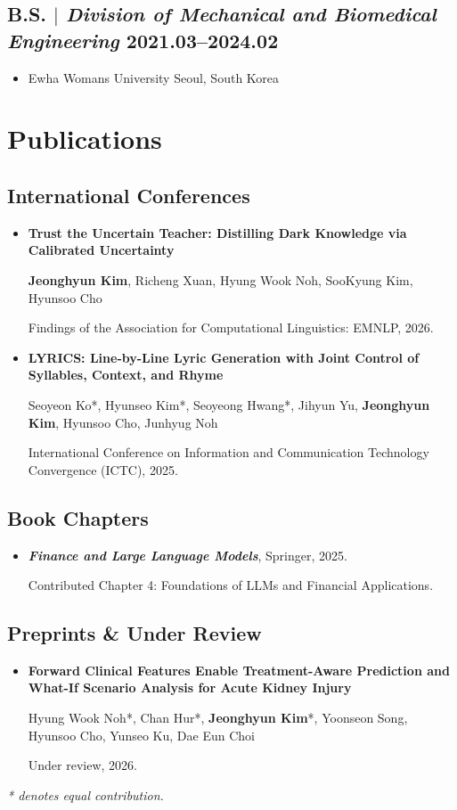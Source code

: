 \documentclass[10pt,a4paper]{article}
\newcommand{\me}{\textbf{Jeonghyun Kim}}
\newcommand{\cvpub}[3]{%
  \item\begin{minipage}[t]{\linewidth}
    \textbf{#1}\par
    #2\par
    #3\par
  \end{minipage}}
\begin{document}
\subsection{B.S. $|$ {\normalfont\textit{Division of Mechanical and Biomedical Engineering}} \hfill 2021.03–2024.02}
\begin{itemize}
  \item Ewha Womans University \hfill Seoul, South Korea
\end{itemize}

\section{Pub\color{black}lications}
\subsection{International Conferences}
\begin{itemize}
\cvpub{Trust the Uncertain Teacher: Distilling Dark Knowledge via Calibrated Uncertainty}
  {\me, Richeng Xuan, Hyung Wook Noh, SooKyung Kim, Hyunsoo Cho}
  {Findings of the Association for Computational Linguistics: EMNLP, 2026.}
\cvpub{LYRICS: Line-by-Line Lyric Generation with Joint Control of Syllables, Context, and Rhyme}
  {Seoyeon Ko*, Hyunseo Kim*, Seoyeong Hwang*, Jihyun Yu, \me, Hyunsoo Cho, Junhyug Noh}
  {International Conference on Information and Communication Technology Convergence (ICTC), 2025.}
\end{itemize}

\subsection{Book Chapters}
\begin{itemize}
\item\begin{minipage}[t]{\linewidth}
    \textbf{\textit{Finance and Large Language Models}}, Springer, 2025.\par
    Contributed Chapter 4: Foundations of LLMs and Financial Applications.
  \end{minipage}
\end{itemize}

\subsection{Preprints \& Under Review}
\begin{itemize}
\cvpub{Forward Clinical Features Enable Treatment-Aware Prediction and What-If Scenario Analysis for Acute Kidney Injury}
  {Hyung Wook Noh*, Chan Hur*, \me*, Yoonseon Song, Hyunsoo Cho, Yunseo Ku, Dae Eun Choi}
  {Under review, 2026.}
\end{itemize}
\smallskip
{\footnotesize\textit{* denotes equal contribution.}}
\end{document}

